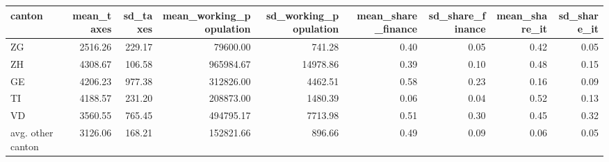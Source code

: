 \begin{tabular}{lrrrrrrrr}
\toprule
           canton &  mean\_taxes &  sd\_taxes &  mean\_working\_population &  sd\_working\_population &  mean\_share\_finance &  sd\_share\_finance &  mean\_share\_it &  sd\_share\_it \\
\midrule
               ZG &     2516.26 &    229.17 &                 79600.00 &                 741.28 &                0.40 &              0.05 &           0.42 &         0.05 \\
               ZH &     4308.67 &    106.58 &                965984.67 &               14978.86 &                0.39 &              0.10 &           0.48 &         0.15 \\
               GE &     4206.23 &    977.38 &                312826.00 &                4462.51 &                0.58 &              0.23 &           0.16 &         0.09 \\
               TI &     4188.57 &    231.20 &                208873.00 &                1480.39 &                0.06 &              0.04 &           0.52 &         0.13 \\
               VD &     3560.55 &    765.45 &                494795.17 &                7713.98 &                0.51 &              0.30 &           0.45 &         0.32 \\
avg. other canton &     3126.06 &    168.21 &                152821.66 &                 896.66 &                0.49 &              0.09 &           0.06 &         0.05 \\
\bottomrule
\end{tabular}
